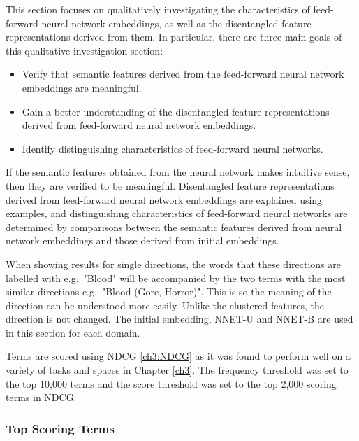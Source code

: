 This  section  focuses on qualitatively investigating the characteristics of feed-forward neural network embeddings, as well as the disentangled feature representations derived from them. In particular, there are three main goals of this qualitative investigation section:

\begin{itemize}
	\item Verify that semantic features derived from the feed-forward neural network embeddings are meaningful.
	\item Gain a better understanding of the disentangled feature representations derived from feed-forward neural network embeddings.
	\item Identify distinguishing characteristics of feed-forward neural networks. 
\end{itemize}

If the semantic features obtained from the neural network makes intuitive sense, then they are verified  to be meaningful. Disentangled feature representations derived from feed-forward neural network embeddings are explained using examples, and  distinguishing characteristics of feed-forward neural networks are determined by comparisons between the semantic features derived from neural network embeddings and those derived from initial embeddings. %

When showing results for single directions, the words that these directions are labelled with e.g.\ "Blood" will be accompanied by the two terms with the most similar directions e.g.\ "Blood (Gore, Horror)". This is so the meaning of the direction can be understood more easily. Unlike the clustered features, the direction is not changed. The initial embedding, NNET-U and NNET-B are used in this section for each domain.  

Terms are scored using NDCG \ref{ch3:NDCG} as it was found to perform well on a variety of tasks and spaces in Chapter \ref{ch3}. The frequency threshold was set to the top 10,000 terms and the score threshold was set to the top 2,000 scoring terms in NDCG. 

\subsubsection{Top Scoring Terms}\label{ch5:topscore}

